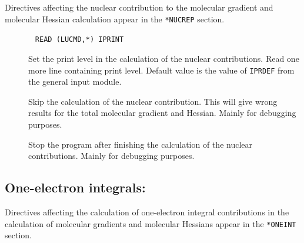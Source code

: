 Directives affecting the nuclear contribution to the molecular
gradient and molecular Hessian
calculation appear in the
\verb|*NUCREP| section.
\begin{description}
\item[]\verb| |\newline
\verb|READ (LUCMD,*) IPRINT|

Set the print level in the calculation of the nuclear contributions.
Read one more line containing print level. Default value is the
value of \verb|IPRDEF| from the general input module.

\item[] Skip the calculation of the nuclear
contribution. This will give wrong
results for the total molecular gradient and Hessian. Mainly for
debugging purposes.

\item[] Stop the program after finishing the calculation
of the nuclear contributions. Mainly for debugging purposes.
\end{description}

\subsection{One-electron integrals: }

Directives affecting the calculation of one-electron integral contributions in the
calculation of molecular gradients and molecular
Hessians appear in the \verb|*ONEINT| section.

